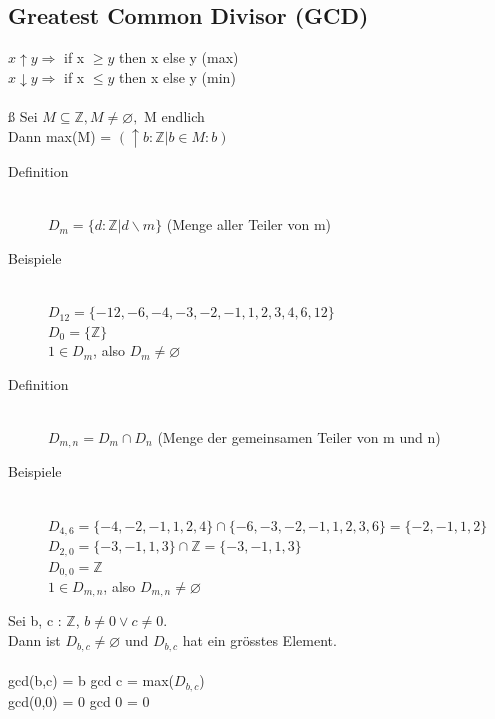 \documentclass[a4paper,10pt]{article}
\newcommand{\ZN}{\mathbb{Z}} %
\newcommand{\Ra}{\Rightarrow}
\begin{document}
\subsection{Greatest Common Divisor (GCD)}
$x \uparrow y \Ra$ if x $\geq y$ then x else y (max) \\
$x \downarrow y \Ra$ if x $\leq y$ then x else y (min) \\ 
\\ß
Sei $M \subseteq \ZN, M \neq \varnothing,$ M endlich \\
Dann max(M) = $(\uparrow b: \ZN | b \in M:b)$

\begin{description}
	\item[Definition] \hfill \\
		$D_m = \{ d : \ZN | d \backslash m \}$ (Menge aller Teiler von m)
	\item[Beispiele] \hfill \\
		$D_{12} = \{-12, -6, -4, -3, -2, -1, 1, 2, 3, 4, 6, 12\}$ \\
		$D_0 = \{ \ZN \}$ \\
		$1 \in D_m$, also $D_m \neq\varnothing$
\end{description}
\begin{description}
	\item[Definition] \hfill \\
		$D_{m,n} = D_m \cap D_n$ (Menge der gemeinsamen Teiler von m und n)
	\item[Beispiele] \hfill \\
		$D_{4,6} = \{-4, -2, -1, 1, 2, 4\} \cap \{-6, -3, -2, -1, 1, 2, 3, 6\} = \{-2, -1, 1, 2\}$ \\
		$D_{2,0} = \{-3, -1, 1, 3\} \cap \ZN = \{-3, -1, 1, 3\}$ \\
		$D_{0,0} = \ZN$ \\
		$1 \in D_{m,n}$, also $D_{m,n} \neq \varnothing$
\end{description}
Sei b, c : $\ZN$, $b \neq 0 \vee c \neq 0$. \\
Dann ist $D_{b,c} \neq \varnothing$ und $D_{b,c}$ hat ein gr\"osstes Element.\\
\\
gcd(b,c) = b gcd c = max($D_{b,c}$) \\
gcd(0,0) = 0 gcd 0 = 0
\end{document}
